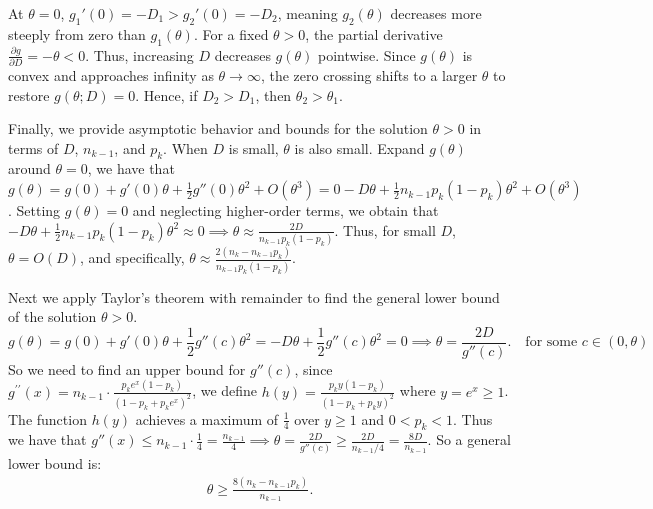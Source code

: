 At \(\theta = 0\), \(g_1'(0) = -D_1 > g_2'(0) = -D_2\), meaning \(g_2(\theta)\) decreases more steeply from zero than \(g_1(\theta)\). For a fixed \(\theta > 0\), the partial derivative \(\frac{\partial g}{\partial D} = -\theta < 0\). Thus, increasing \(D\) decreases \(g(\theta)\) pointwise. Since \(g(\theta)\) is convex and approaches infinity as \(\theta \to \infty\), the zero crossing shifts to a larger \(\theta\) to restore \(g(\theta; D) = 0\). Hence, if \(D_2 > D_1\), then \(\theta_2 > \theta_1\).

Finally, we provide asymptotic behavior and bounds for the solution \(\theta>0\) in terms of \(D\), \(n_{k-1}\), and \(p_k\). When \(D\) is small, \(\theta\) is also small. Expand \(g(\theta)\) around \(\theta = 0\), we have that $g(\theta) = g(0) + g'(0) \theta + \frac{1}{2} g''(0) \theta^2 + O(\theta^3) = 0 - D \theta + \frac{1}{2} n_{k-1} p_k (1 - p_k) \theta^2 + O(\theta^3)$. Setting \(g(\theta) = 0\) and neglecting higher-order terms, we obtain that $-D \theta + \frac{1}{2} n_{k-1} p_k (1 - p_k) \theta^2 \approx 0 \implies \theta \approx \frac{2D}{n_{k-1} p_k (1 - p_k)}$. Thus, for small \(D\), \(\theta = O(D)\), and specifically, $\theta \approx \frac{2 (n_k - n_{k-1} p_k)}{n_{k-1} p_k (1 - p_k)}$.

Next we apply Taylor's theorem with remainder to find the general lower bound of the solution $\theta>0$.
$$g(\theta) = g(0) + g'(0) \theta + \frac{1}{2} g''(c) \theta^2 = -D \theta + \frac{1}{2} g''(c) \theta^2 = 0\implies \theta = \frac{2D}{g''(c)}. \quad \text{for some } c \in (0, \theta)$$
So we need to find an upper bound for \(g''(c)\), since $g^{\prime \prime}(x) = n_{k-1} \cdot \frac{p_k e^{x} (1 - p_k)}{(1 - p_k + p_k e^{x})^2}$, we define \(h(y) = \frac{p_k y (1 - p_k)}{(1 - p_k + p_k y)^2}\) where \(y = e^{x} \geq 1\). The function \(h(y)\) achieves a maximum of \(\frac{1}{4}\) over $y\geq 1$ and $0<p_k<1$. Thus we have that $
g''(x) \leq n_{k-1} \cdot \frac{1}{4} = \frac{n_{k-1}}{4} \implies \theta = \frac{2D}{g''(c)} \geq \frac{2D}{n_{k-1}/4} = \frac{8D}{n_{k-1}}$. So a general lower bound is:
\begin{align}
    \theta \geq \frac{8 (n_k - n_{k-1} p_k)}{n_{k-1}}.\label{eq::theta lower bound}
\end{align}